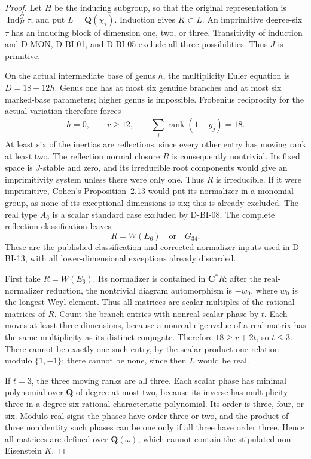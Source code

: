 \begin{proof}
Let $H$ be the inducing subgroup, so that the original
representation is $\operatorname{Ind}_H^G\tau$, and put
$L=\mathbf Q(\chi_\tau)$.  Induction gives $K\subset L$.
An imprimitive degree-six $\tau$ has an inducing block of
dimension one, two, or three.  Transitivity of induction and
D-MON, D-BI-01, and D-BI-05 exclude all three possibilities.
Thus $J$ is primitive.

On the actual intermediate base of genus $h$, the multiplicity
Euler equation is $D=18-12h$.  Genus one has at most six genuine
branches and at most six marked-base parameters; higher genus
is impossible.  Frobenius reciprocity for the actual variation
therefore forces
\[
          h=0,\qquad r\ge12,\qquad
          \sum_j\operatorname{rank}(1-g_j)=18.              \tag{BI.56}
\]
At least six of the inertias are reflections, since every other
entry has moving rank at least two.  The reflection normal
closure $R$ is consequently nontrivial.  Its fixed space is
$J$-stable and zero, and its irreducible root components would
give an imprimitivity system unless there were only one.  Thus
$R$ is irreducible.  If it were imprimitive, Cohen's
Proposition~2.13 would put its normalizer in a monomial group,
as none of its exceptional dimensions is six; this is already
excluded.  The real type $A_6$ is a scalar standard case excluded
by D-BI-08.  The complete reflection classification leaves
\[
                         R=W(E_6)\quad\text{or}\quad G_{34}.
\]
These are the published classification and corrected normalizer
inputs used in D-BI-13, with all lower-dimensional exceptions
already discarded.

First take $R=W(E_6)$.  Its normalizer is contained in
$\mathbf C^*R$: after the real-normalizer reduction, the
nontrivial diagram automorphism is $-w_0$, where $w_0$ is the
longest Weyl element.  Thus all matrices are scalar multiples
of the rational matrices of $R$.  Count the branch entries with
nonreal scalar phase by $t$.  Each moves at least three
dimensions, because a nonreal eigenvalue of a real matrix has
the same multiplicity as its distinct conjugate.  Therefore
$18\ge r+2t$, so $t\le3$.  There cannot be exactly one such
entry, by the scalar product-one relation modulo $\{1,-1\}$;
there cannot be none, since then $L$ would be real.

If $t=3$, the three moving ranks are all three.  Each scalar
phase has minimal polynomial over $\mathbf Q$ of degree at
most two, because its inverse has multiplicity three in a
degree-six rational characteristic polynomial.  Its order is
three, four, or six.  Modulo real signs the phases have order
three or two, and the product of three nonidentity such phases
can be one only if all three have order three.  Hence all
matrices are defined over $\mathbf Q(\omega)$, which cannot
contain the stipulated non-Eisenstein $K$.


\end{proof}
